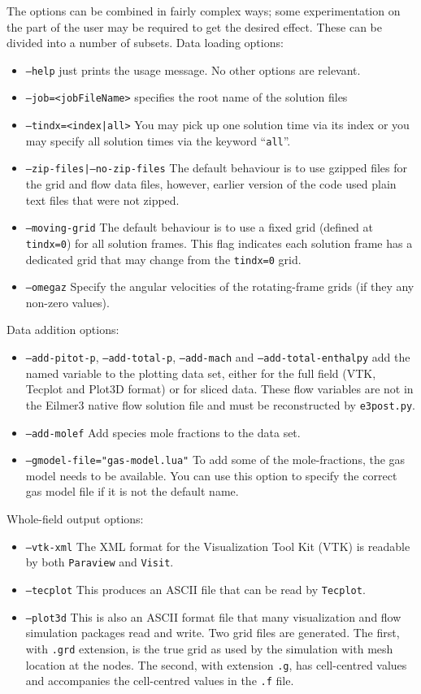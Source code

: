 \noindent
The options can be combined in fairly complex ways; some experimentation on the part of the user
may be required to get the desired effect.
These can be divided into a number of subsets.
Data loading options:
\begin{itemize}
  \item \texttt{--help} just prints the usage message.  No other options are relevant.
  \item \texttt{--job=<jobFileName>} specifies the root name of the solution files
  \item \texttt{--tindx=<index|all>} You may pick up one solution time via its index or you may
     specify all solution times via the keyword ``\texttt{all}''.
  \item \texttt{--zip-files|--no-zip-files} The default behaviour is to use gzipped files for the
     grid and flow data files, however, earlier version of the code used plain text files that were not zipped.
  \item \texttt{--moving-grid} The default behaviour is to use a fixed grid (defined at \texttt{tindx=0}) for all
     solution frames.
     This flag indicates each solution frame has a dedicated grid that may change from the \texttt{tindx=0} grid.
  \item \texttt{--omegaz} Specify the angular velocities of the rotating-frame grids (if they any non-zero values).
\end{itemize}
Data addition options:
\begin{itemize}
  \item \texttt{--add-pitot-p}, \texttt{--add-total-p}, \texttt{--add-mach} and \texttt{--add-total-enthalpy} add the
     named variable to the plotting data set, either for the full field (VTK, Tecplot and Plot3D format) or for sliced data.
     These flow variables are not in the Eilmer3 native flow solution file and must be reconstructed by \texttt{e3post.py}.
  \item \texttt{--add-molef} Add species mole fractions to the data set.
  \item \texttt{--gmodel-file="gas-model.lua"} To add some of the mole-fractions, the gas model needs to
     be available.  You can use this option to specify the correct gas model file if it is not the default name.
\end{itemize}
Whole-field output options:
\begin{itemize}
  \item \texttt{--vtk-xml} The XML format for the Visualization Tool Kit (VTK) is readable by both \texttt{Paraview}
     and \texttt{Visit}.
  \item \texttt{--tecplot} This produces an ASCII file that can be read by \texttt{Tecplot}.
  \item \texttt{--plot3d} This is also an ASCII format file that many visualization and flow simulation
     packages read and write.
     Two grid files are generated.  The first, with \texttt{.grd} extension, 
     is the true grid as used by the simulation with mesh location at the nodes.  
     The second, with extension \texttt{.g}, has cell-centred values and accompanies 
     the cell-centred values in the \texttt{.f} file.
\end{itemize}
